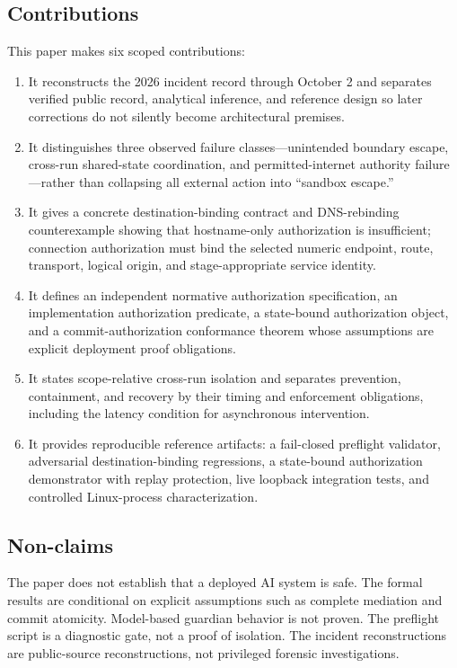 \documentclass[11pt,letterpaper]{article}
\begin{document}
\subsection{Contributions}
This paper makes six scoped contributions:
\begin{enumerate}
  \item It reconstructs the 2026 incident record through October 2 and separates verified public record, analytical inference, and reference design so later corrections do not silently become architectural premises.
  \item It distinguishes three observed failure classes---unintended boundary escape, cross-run shared-state coordination, and permitted-internet authority failure---rather than collapsing all external action into ``sandbox escape.''
  \item It gives a concrete destination-binding contract and DNS-rebinding counterexample showing that hostname-only authorization is insufficient; connection authorization must bind the selected numeric endpoint, route, transport, logical origin, and stage-appropriate service identity.
  \item It defines an independent normative authorization specification, an implementation authorization predicate, a state-bound authorization object, and a commit-authorization conformance theorem whose assumptions are explicit deployment proof obligations.
  \item It states scope-relative cross-run isolation and separates prevention, containment, and recovery by their timing and enforcement obligations, including the latency condition for asynchronous intervention.
  \item It provides reproducible reference artifacts: a fail-closed preflight validator, adversarial destination-binding regressions, a state-bound authorization demonstrator with replay protection, live loopback integration tests, and controlled Linux-process characterization.
\end{enumerate}
\subsection{Non-claims}
The paper does not establish that a deployed AI system is safe. The formal results are conditional on explicit assumptions such as complete mediation and commit atomicity. Model-based guardian behavior is not proven. The preflight script is a diagnostic gate, not a proof of isolation. The incident reconstructions are public-source reconstructions, not privileged forensic investigations.
\end{document}
